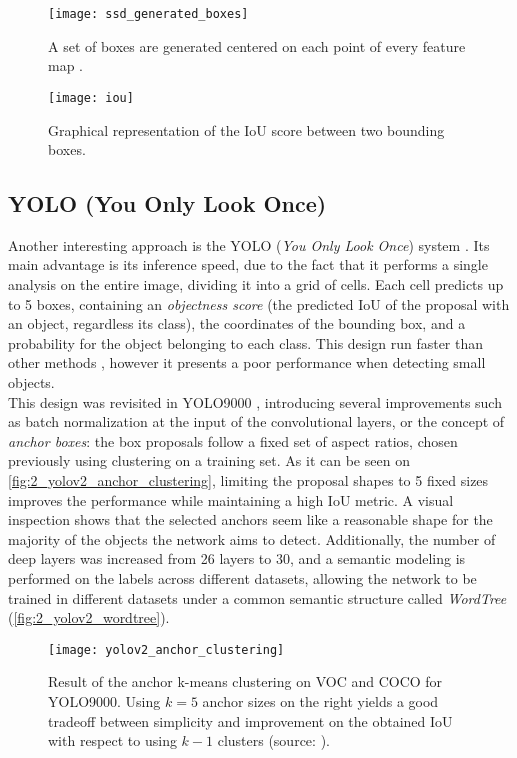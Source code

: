 \begin{figure}[h]
	\centering
	\texttt{[image: ssd\_generated\_boxes]}
	\caption{A set of boxes are generated centered on each point of every feature map \cite{ssd}.}
	\label{fig:2_ssd_generated_boxes}
\end{figure}

\begin{figure}[h]
	\centering
	\texttt{[image: iou]}
	\caption{Graphical representation of the IoU score between two bounding boxes.}
	\label{fig:2_iou}
\end{figure}

\subsection{YOLO (You Only Look Once)}
\label{sec:2_yolo}
Another interesting approach is the YOLO (\textit{You Only Look Once}) system \cite{yolov1}. Its main advantage is its inference speed, due to the fact that it performs a single analysis on the entire image, dividing it into a grid of cells. Each cell predicts up to 5 boxes, containing an \textit{objectness score} (the predicted IoU of the proposal with an object, regardless its class), the coordinates of the bounding box, and a probability for the object belonging to each class. This design run faster than other methods \cite{yolov1}, however it presents a poor performance when detecting small objects.\\

This design was revisited in YOLO9000 \cite{yolov2}, introducing several improvements such as batch normalization at the input of the convolutional layers, or the concept of \textit{anchor boxes}: the box proposals follow a fixed set of aspect ratios, chosen previously using clustering on a training set. As it can be seen on \autoref{fig:2_yolov2_anchor_clustering}, limiting the proposal shapes to 5 fixed sizes improves the performance while maintaining a high IoU metric. A visual inspection shows that the selected anchors seem like a reasonable shape for the majority of the objects the network aims to detect. Additionally, the number of deep layers was increased from 26 layers to 30, and a semantic modeling is performed on the labels across different datasets, allowing the network to be trained in different datasets under a common semantic structure called \textit{WordTree} (\autoref{fig:2_yolov2_wordtree}).

\begin{figure}[h]
	\centering
	\texttt{[image: yolov2\_anchor\_clustering]}
	\caption{Result of the anchor k-means clustering on VOC and COCO for YOLO9000. Using $k=5$ anchor sizes on the right yields a good tradeoff between simplicity and improvement on the obtained IoU with respect to using $k-1$ clusters (source: \cite{yolov2}).}
	\label{fig:2_yolov2_anchor_clustering}
\end{figure}


